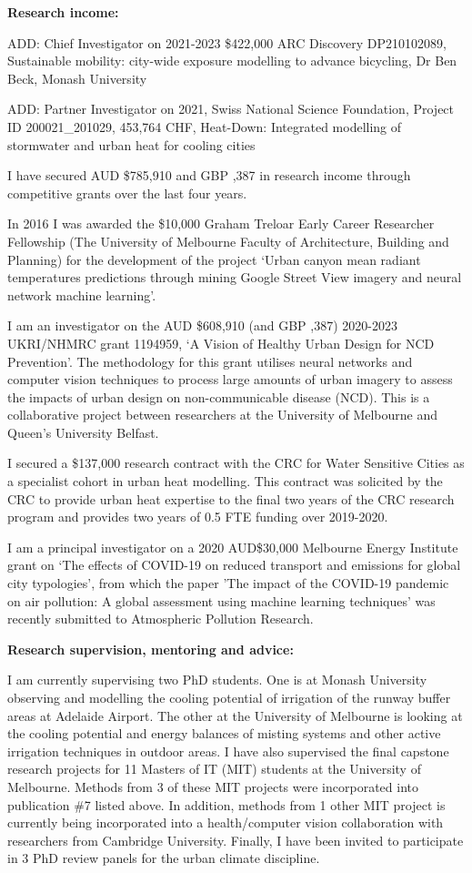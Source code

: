 \textbf{Research income:}

ADD: Chief Investigator on 2021-2023 \$422,000 ARC Discovery DP210102089, Sustainable mobility: city-wide exposure modelling to advance bicycling, Dr Ben Beck, Monash University

ADD: Partner Investigator on 2021, Swiss National Science Foundation, Project ID 200021\_201029, 453,764 CHF, Heat-Down: Integrated modelling of stormwater and urban heat for cooling cities

I have secured AUD \$785,910 and GBP ,387 in research income through competitive grants over the last four years.

In 2016 I was awarded the \$10,000 Graham Treloar Early Career Researcher Fellowship (The University of Melbourne Faculty of Architecture, Building and Planning) for the development of the project `Urban canyon mean radiant temperatures predictions through mining Google Street View imagery and neural network machine learning'.

I am an investigator on the AUD \$608,910 (and GBP ,387) 2020-2023 UKRI/NHMRC grant 1194959, `A Vision of Healthy Urban Design for NCD Prevention'. The methodology for this grant utilises neural networks and computer vision techniques to process large amounts of urban imagery to assess the impacts of urban design on non-communicable disease (NCD). This is a collaborative project between researchers at the University of Melbourne and Queen's University Belfast.

I secured a \$137,000 research contract with the CRC for Water Sensitive Cities as a specialist cohort in urban heat modelling. This contract was solicited by the CRC to provide urban heat expertise to the final two years of the CRC research program and provides two years of 0.5 FTE funding over 2019-2020.

I am a principal investigator on a 2020 AUD\$30,000 Melbourne Energy Institute grant on `The effects of COVID-19 on reduced transport and emissions for global city typologies', from which the paper 'The impact of the COVID-19 pandemic on air pollution: A global assessment using machine learning techniques' was recently submitted to Atmospheric Pollution Research.

\textbf{Research supervision, mentoring and advice:}

I am currently supervising two PhD students. One is at Monash University observing and modelling the cooling potential of irrigation of the runway buffer areas at Adelaide Airport. The other at the University of Melbourne is looking at the cooling potential and energy balances of misting systems and other active irrigation techniques in outdoor areas. I have also supervised the final capstone research projects for 11 Masters of IT (MIT) students at the University of Melbourne. Methods from 3 of these MIT projects were incorporated into publication \#7 listed above. In addition, methods from 1 other MIT project is currently being incorporated into a health/computer vision collaboration with researchers from Cambridge University. Finally, I have been invited to participate in 3 PhD review panels for the urban climate discipline.



